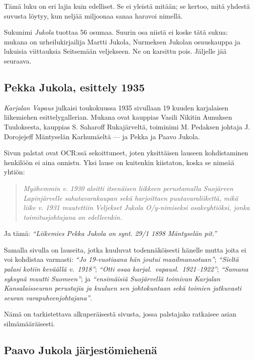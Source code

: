 \documentclass[10pt,a4paper]{article}
\begin{document}
Tämä luku on eri lajia kuin edelliset. Se ei yleistä mitään; se kertoo, mitä yhdestä
suvusta löytyy, kun neljää miljoonaa sanaa haravoi nimellä.

Sukunimi \emph{Jukola} tuottaa 56 osumaa. Suurin osa niistä ei koske tätä sukua:
mukana on urheilukirjailija Martti Jukola, Nurmeksen Jukolan osuuskauppa ja lukuisia
viittauksia Seitsemään veljekseen. Ne on karsittu pois. Jäljelle jää seuraava.

\subsection{Pekka Jukola, esittely 1935}

\emph{Karjalan Vapaus} julkaisi toukokuussa 1935 sivullaan 19 kuuden karjalaisen
liikemiehen esittelygallerian. Mukana ovat kauppias Vasili Nikitin Aunuksen
Tuuloksesta, kauppias S. Saharoff Rukajärveltä, toiminimi M. Pedaksen johtaja
J. Dorojejeff Mäntyselän Karhumäeltä --- ja Pekka ja Paavo Jukola.

Sivun palstat ovat OCR:ssä sekoittuneet, joten yksittäisen lauseen kohdistaminen
henkilöön ei aina onnistu. Yksi lause on kuitenkin kiistaton, koska se nimeää yhtiön:

\begin{quote}\itshape
Myöhemmin v. 1930 aloitti itsenäisen liikkeen perustamalla Suojärven Lapinjärvelle
sahatavarakaupan sekä harjoittaen puutavaraliikettä, mikä liike v. 1931 muutettiin
Veljekset Jukola O/y-nimiseksi osakeyhtiöksi, jonka toimitusjohtajana on edelleenkin.
\end{quote}

Ja tämä: \emph{``Liikemies Pekka Jukola on synt. 29/1 1898 Mäntyselän pit.''}

Samalla sivulla on lauseita, jotka kuuluvat todennäköisesti hänelle mutta joita ei voi
kohdistaa varmasti: \emph{``Jo 19-vuotiaana hän joutui maailmansotaan''};
\emph{``Sieltä palasi kotiin keväällä v.\ 1918''}; \emph{``Otti osaa karjal.\ vapausl.\
1921--1922''}; \emph{``Samana syksynä muutti Suomeen''}; ja
\emph{``ensimäisiä Suojärvellä toimivan Karjalan Kansalaisseuran perustajia ja kuuluen
sen johtokuntaan sekä toimien jatkuvasti seuran varapuheenjohtajana''}.

Nämä on tarkistettava alkuperäisestä sivusta, jossa palstajako ratkaisee asian
silmämääräisesti.

\subsection{Paavo Jukola järjestömiehenä}
\end{document}
